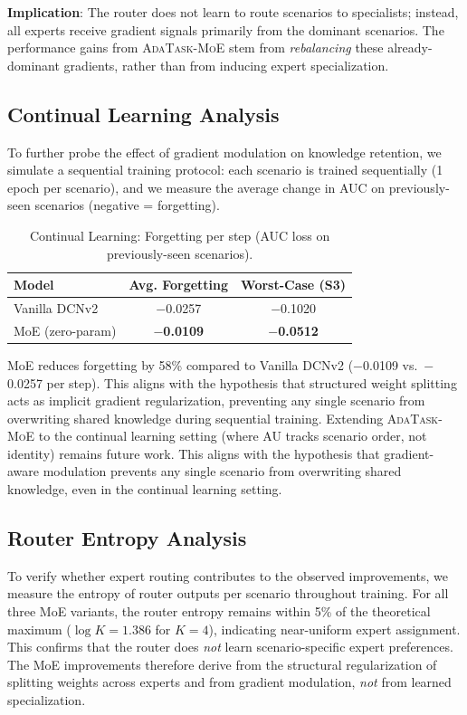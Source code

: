 \documentclass{article}
\begin{document}
\textbf{Implication}: The router does not learn to route scenarios to specialists; instead, all experts receive gradient signals primarily from the dominant scenarios.
The performance gains from \textsc{AdaTask-MoE} stem from \emph{rebalancing} these already-dominant gradients, rather than from inducing expert specialization.

\subsection{Continual Learning Analysis}
\label{sec:continual}

To further probe the effect of gradient modulation on knowledge retention, we simulate a sequential training protocol:
each scenario is trained sequentially (1 epoch per scenario), and we measure the average change in AUC on previously-seen scenarios (negative = forgetting).

\begin{table}[H]
\centering
\caption{Continual Learning: Forgetting per step (AUC loss on previously-seen scenarios).}
\label{tab:continual}
\begin{tabular}{lcc}
\toprule
\textbf{Model} & \textbf{Avg. Forgetting} & \textbf{Worst-Case (S3)} \\
\midrule
Vanilla DCNv2 & $-$0.0257 & $-$0.1020 \\
MoE (zero-param) & \textbf{$-$0.0109} & \textbf{$-$0.0512} \\
\bottomrule
\end{tabular}
\end{table}

MoE reduces forgetting by 58\% compared to Vanilla DCNv2 ($-$0.0109 vs.\ $-$0.0257 per step).
This aligns with the hypothesis that structured weight splitting acts as implicit gradient regularization, preventing any single scenario from overwriting shared knowledge during sequential training.
Extending \textsc{AdaTask-MoE} to the continual learning setting (where AU tracks scenario order, not identity) remains future work. This aligns with the hypothesis that gradient-aware modulation prevents any single scenario from overwriting shared knowledge, even in the continual learning setting.

\subsection{Router Entropy Analysis}
\label{sec:router}

To verify whether expert routing contributes to the observed improvements, we measure the entropy of router outputs per scenario throughout training.
For all three MoE variants, the router entropy remains within 5\% of the theoretical maximum ($\log K = 1.386$ for $K=4$), indicating near-uniform expert assignment.
This confirms that the router does \emph{not} learn scenario-specific expert preferences.
The MoE improvements therefore derive from the structural regularization of splitting weights across experts and from gradient modulation, \emph{not} from learned specialization.
\end{document}
